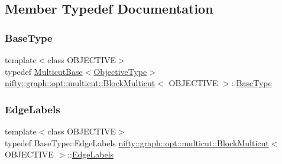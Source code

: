 \subsection{Member Typedef Documentation}
\mbox{\label{classnifty_1_1graph_1_1opt_1_1multicut_1_1BlockMulticut_a5faaa5d12aee25352f643f040c9f8295}} 
\subsubsection{\texorpdfstring{Base\+Type}{BaseType}}
{\footnotesize\ttfamily template$<$class O\+B\+J\+E\+C\+T\+I\+VE$>$ \\
typedef \hyperlink{classnifty_1_1graph_1_1opt_1_1multicut_1_1MulticutBase}{Multicut\+Base}$<$\hyperlink{classnifty_1_1graph_1_1opt_1_1multicut_1_1BlockMulticut_a3a9ea9285ed606615a72dead69babd0a}{Objective\+Type}$>$ \hyperlink{classnifty_1_1graph_1_1opt_1_1multicut_1_1BlockMulticut}{nifty\+::graph\+::opt\+::multicut\+::\+Block\+Multicut}$<$ O\+B\+J\+E\+C\+T\+I\+VE $>$\+::\hyperlink{classnifty_1_1graph_1_1opt_1_1multicut_1_1BlockMulticut_a5faaa5d12aee25352f643f040c9f8295}{Base\+Type}}

\mbox{\label{classnifty_1_1graph_1_1opt_1_1multicut_1_1BlockMulticut_a7ff3652347070b677128196d42f0edd2}} 
\subsubsection{\texorpdfstring{Edge\+Labels}{EdgeLabels}}
{\footnotesize\ttfamily template$<$class O\+B\+J\+E\+C\+T\+I\+VE$>$ \\
typedef Base\+Type\+::\+Edge\+Labels \hyperlink{classnifty_1_1graph_1_1opt_1_1multicut_1_1BlockMulticut}{nifty\+::graph\+::opt\+::multicut\+::\+Block\+Multicut}$<$ O\+B\+J\+E\+C\+T\+I\+VE $>$\+::\hyperlink{classnifty_1_1graph_1_1opt_1_1multicut_1_1BlockMulticut_a7ff3652347070b677128196d42f0edd2}{Edge\+Labels}}

